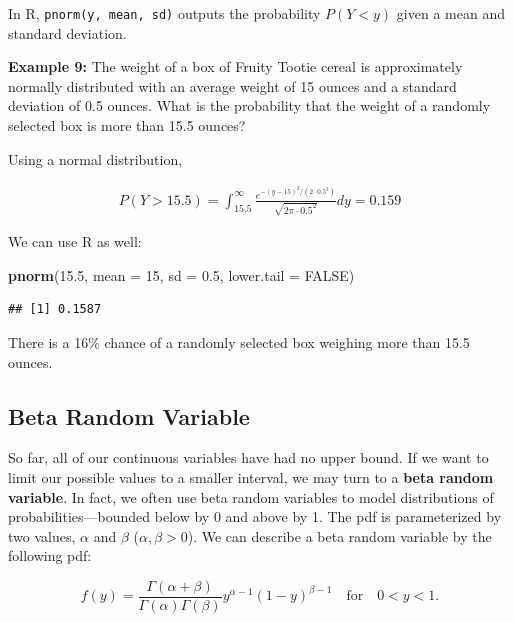 \documentclass[
]{krantz}
\newenvironment{Shaded}{\begin{snugshade}}{\end{snugshade}}
\newcommand{\DataTypeTok}[1]{\textcolor[rgb]{0.27,0.27,0.27}{#1}}
\newcommand{\DecValTok}[1]{\textcolor[rgb]{0.06,0.06,0.06}{#1}}
\newcommand{\FloatTok}[1]{\textcolor[rgb]{0.06,0.06,0.06}{#1}}
\newcommand{\KeywordTok}[1]{\textcolor[rgb]{0.27,0.27,0.27}{\textbf{#1}}}
\newcommand{\NormalTok}[1]{#1}
\newcommand{\OtherTok}[1]{\textcolor[rgb]{0.37,0.37,0.37}{#1}}
\begin{document}
In R, \texttt{pnorm(y,\ mean,\ sd)} outputs the probability \(P(Y < y)\) given a mean and standard deviation.

\textbf{Example 9:} The weight of a box of Fruity Tootie cereal is approximately normally distributed with an average weight of 15 ounces and a standard deviation of 0.5 ounces. What is the probability that the weight of a randomly selected box is more than 15.5 ounces?

Using a normal distribution,

\begin{align*} 
P(Y > 15.5) = \int_{15.5}^{\infty} \frac{e^{-(y-15)^2/ (2\cdot 0.5^2)}}{\sqrt{2\pi\cdot 0.5^2}}dy = 0.159
\end{align*}

We can use R as well:

\begin{Shaded}
\begin{Highlighting}[]
\KeywordTok{pnorm}\NormalTok{(}\FloatTok{15.5}\NormalTok{, }\DataTypeTok{mean =} \DecValTok{15}\NormalTok{, }\DataTypeTok{sd =} \FloatTok{0.5}\NormalTok{, }\DataTypeTok{lower.tail =} \OtherTok{FALSE}\NormalTok{)}
\end{Highlighting}
\end{Shaded}

\begin{verbatim}
## [1] 0.1587
\end{verbatim}

There is a 16\% chance of a randomly selected box weighing more than 15.5 ounces.

\hypertarget{beta-random-variable}{%
\subsection{Beta Random Variable}\label{beta-random-variable}}

So far, all of our continuous variables have had no upper bound. If we want to limit our possible values to a smaller interval, we may turn to a \textbf{beta random variable}. In fact, we often use beta random variables to model distributions of probabilities---bounded below by 0 and above by 1. The pdf is parameterized by two values, \(\alpha\) and \(\beta\) (\(\alpha, \beta > 0\)). We can describe a beta random variable by the following pdf:

\begin{equation}
f(y) = \frac{\Gamma(\alpha + \beta)}{\Gamma(\alpha)\Gamma(\beta)} y^{\alpha-1} (1-y)^{\beta-1} \quad \textrm{for} \quad 0 < y < 1.
\label{eq:betaRV}
\end{equation}
\end{document}
